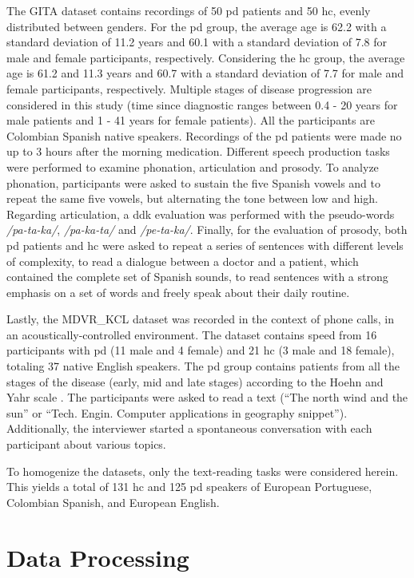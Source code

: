 The GITA dataset contains recordings of 50 \gls{pd} patients and 50 \gls{hc}, evenly distributed between genders. For the \gls{pd} group, the average age is 62.2 with a standard deviation of 11.2 years and 60.1 with a standard deviation of 7.8 for male and female participants, respectively. Considering the \gls{hc} group, the average age is 61.2 and 11.3 years and 60.7 with a standard deviation of 7.7 for male and female participants, respectively. Multiple stages of disease progression are considered in this study (time since diagnostic ranges between 0.4 - 20 years for male patients and 1 - 41 years for female patients). All the participants are Colombian Spanish native speakers. Recordings of the \gls{pd} patients were made no up to 3 hours after the morning medication. Different speech production tasks were performed to examine phonation, articulation and prosody. To analyze phonation, participants were asked to sustain the five Spanish vowels and to repeat the same five vowels, but alternating the tone between low and high. Regarding articulation, a \gls{ddk} evaluation was performed with the pseudo-words \textit{/pa-ta-ka/}, \textit{/pa-ka-ta/} and \textit{/pe-ta-ka/}. Finally, for the evaluation of prosody, both \gls{pd} patients and \gls{hc} were asked to repeat a series of sentences with different levels of complexity, to read a dialogue between a doctor and a patient, which contained the complete set of Spanish sounds, to read sentences with a strong emphasis on a set of words and freely speak about their daily routine.

Lastly, the MDVR\_KCL dataset was recorded in the context of phone calls, in an acoustically-controlled environment. The dataset contains speed from 16 participants with \gls{pd} (11 male and 4 female) and 21 \gls{hc} (3 male and 18 female), totaling 37 native English speakers. The \gls{pd} group contains patients from all the stages of the disease (early, mid and late stages) according to the  Hoehn and Yahr scale \cite{hoehn_yahr}. The participants were asked to read a text (``The north wind and the sun'' or ``Tech. Engin. Computer applications in geography snippet''). Additionally, the interviewer started a spontaneous conversation with each participant about various topics.

To homogenize the datasets, only the text-reading tasks were considered herein. This yields a total of 131 \gls{hc} and 125 \gls{pd} speakers of European Portuguese, Colombian Spanish, and European English. 

\section{Data Processing}

